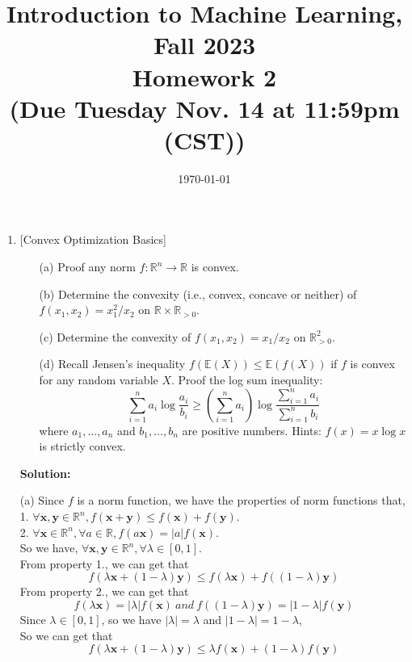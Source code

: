 \documentclass[10pt]{article}
\begin{document}
\date{\today}
\title{Introduction to Machine Learning, Fall 2023 \\
	Homework 2\\
	\small (Due Tuesday Nov. 14 at 11:59pm (CST))}
\maketitle

\begin{enumerate}[1.]


	\item {} [Convex Optimization Basics]
	      \begin{itemize}
		      \item[(a)] Proof any norm $f:\mathbb{R}^{n}\rightarrow\mathbb{R}$ is convex.~
		      \item[(b)] Determine the convexity (i.e., convex, concave or neither) of $f(x_1,x_2)=x_1^2/x_2$ on $\mathbb{R}\times\mathbb{R}_{>0}$.~
		      \item[(c)] Determine the convexity of $f(x_1,x_2)=x_1/x_2$ on $\mathbb{R}_{>0}^{2}$.~
			  \item[(d)] Recall Jensen's inequality $f(\mathbb{E}(X)) \leq \mathbb{E}(f(X))$ if $f$ is convex for any random variable $X$. 
			  Proof the log sum inequality: 
			  \[
				\sum_{i=1}^{n} a_i \log \frac{a_i}{b_i} \geq \left( \sum_{i=1}^{n} a_i\right) \log \frac{\sum_{i=1}^{n} a_i}{\sum_{i=1}^{n} b_i} 
			  \]
			  where $a_1,\ldots,a_n$ and $b_1,\ldots,b_n$ are positive numbers. Hints: $f(x)=x\log x$ is strictly convex.~
	      \end{itemize}

		  \textbf{Solution:}

 		  (a) Since $f$ is a norm function, we have the properties of norm functions that,\\
		  1. $\forall \mathbf{x},\mathbf{y}\in \mathbb{R}^{n}, f(\mathbf{x}+\mathbf{y})\leq f(\mathbf{x})+f(\mathbf{y})$.\\
		  2. $\forall \mathbf{x}\in \mathbb{R}^{n}, \forall a \in \mathbb{R}, f(a\mathbf{x})=|a|f(\mathbf{x})$.\\

		  So we have, $\forall \mathbf{x},\mathbf{y}\in \mathbb{R}^{n}, \forall \lambda \in [0,1]$.\\
		  From property 1., we can get that 
		  $$f(\lambda \mathbf{x}+(1-\lambda)\mathbf{y})\leq f(\lambda \mathbf{x})+f((1-\lambda)\mathbf{y})$$
		  From property 2., we can get that
		  $$f(\lambda \mathbf{x})=|\lambda|f(\mathbf{x})\ and\ f((1-\lambda)\mathbf{y})=|1-\lambda|f(\mathbf{y})$$
		  Since $\lambda \in [0,1]$, so we have $|\lambda|=\lambda$ and $|1-\lambda|=1-\lambda$,\\
		  So we can get that
		  $$f(\lambda \mathbf{x}+(1-\lambda)\mathbf{y})\leq \lambda f(\mathbf{x})+(1-\lambda)f(\mathbf{y})$$
		  

\end{enumerate}
\end{document}
